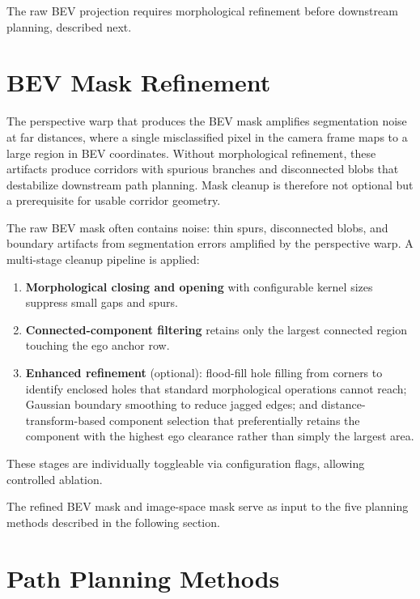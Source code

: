 \documentclass[12pt,letterpaper,oneside]{report}
\begin{document}
The raw BEV projection requires morphological refinement before downstream planning, described next.


\section{BEV Mask Refinement}
\label{sec:mask_refinement}

The perspective warp that produces the BEV mask amplifies segmentation noise at far distances, where a single misclassified pixel in the camera frame maps to a large region in BEV coordinates. Without morphological refinement, these artifacts produce corridors with spurious branches and disconnected blobs that destabilize downstream path planning. Mask cleanup is therefore not optional but a prerequisite for usable corridor geometry.

The raw BEV mask often contains noise: thin spurs, disconnected blobs, and boundary artifacts from segmentation errors amplified by the perspective warp. A multi-stage cleanup pipeline is applied:

\begin{enumerate}[nosep]
  \item \textbf{Morphological closing and opening} with configurable kernel sizes suppress small gaps and spurs.
  \item \textbf{Connected-component filtering} retains only the largest connected region touching the ego anchor row.
  \item \textbf{Enhanced refinement} (optional): flood-fill hole filling from corners to identify enclosed holes that standard morphological operations cannot reach; Gaussian boundary smoothing to reduce jagged edges; and distance-transform-based component selection that preferentially retains the component with the highest ego clearance rather than simply the largest area.
\end{enumerate}

These stages are individually toggleable via configuration flags, allowing controlled ablation.

The refined BEV mask and image-space mask serve as input to the five planning methods described in the following section.


\section{Path Planning Methods}
\label{sec:planners}
\end{document}
